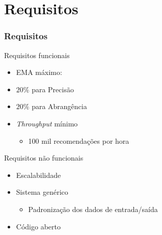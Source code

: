 \section[Requisitos]{Requisitos}
\begin{frame}
\frametitle{Requisitos}
\begin{block}{Requisitos funcionais}
\begin{itemize}
	\item EMA máximo: 
	\item $20\%$ para Precisão
	\item $20\%$ para Abrangência
	\item \textit{Throughput} mínimo
	\begin{itemize}
		\item 100 mil recomendações por hora
	\end{itemize}
\end{itemize}
\end{block}

\begin{block}{Requisitos não funcionais}
\begin{itemize}
	\item Escalabilidade
	\item Sistema genérico
	\begin{itemize}
		\item Padronização dos dados de entrada/saída
	\end{itemize}
	\item Código aberto
\end{itemize}
\end{block}
\end{frame}
